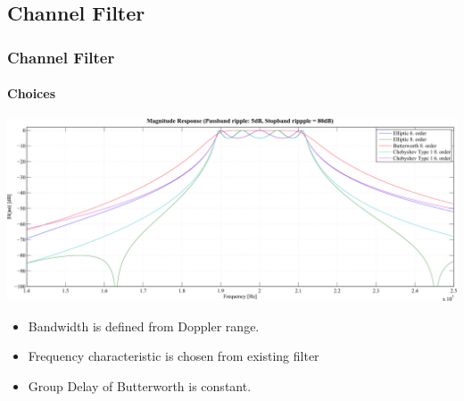 \subsection{Channel Filter} \label{sec:filter}

\begin{frame} \frametitle{Channel Filter}
    \framesubtitle{Choices}
    \begin{center}
        \includegraphics[width=1\textwidth]{img/filter2_frq_res}
    \end{center}
    \begin{itemize}
        \item Bandwidth is defined from Doppler range.
        \item Frequency characteristic is chosen from existing filter
        \item Group Delay of Butterworth is constant.
    \end{itemize}
\end{frame}


